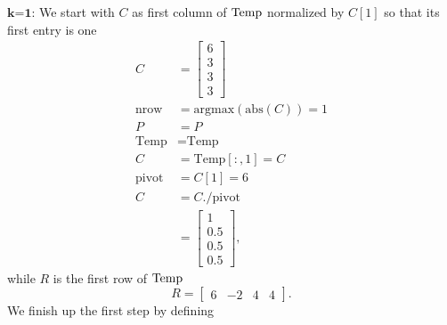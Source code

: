 $\textbf{k=1:}$ We start with $C$ as first column of ${\rm Temp}$ normalized by $C[1]$ so that its first entry is one
\begin{align*}
    C &=\left[\begin{array}{r} 6 \\ 3 \\ 3 \\ 3 \end{array} \right] \\
    \textrm{nrow} &= \textrm{argmax}\left(\textrm{abs}\left(C\right) \right) = 1 \\
    P &= P \\
    \textrm{Temp} &= \textrm{Temp} \\
    C &= \textrm{Temp}\left[ :, 1\right] = C\\
    \textrm{pivot}&=C[1] = 6\\
    C &=C. \slash \textrm{pivot} \\
    &= \left[\begin{array}{r} 1 \\ 0.5 \\0.5 \\0.5 \end{array} \right],
\end{align*}
while $R$ is the first row of  ${\rm Temp}$ 
$$ R = \left[\begin{array}{rrrr} 6 & -2& 4 & 4 \end{array} \right].$$
We finish up the first step by defining
